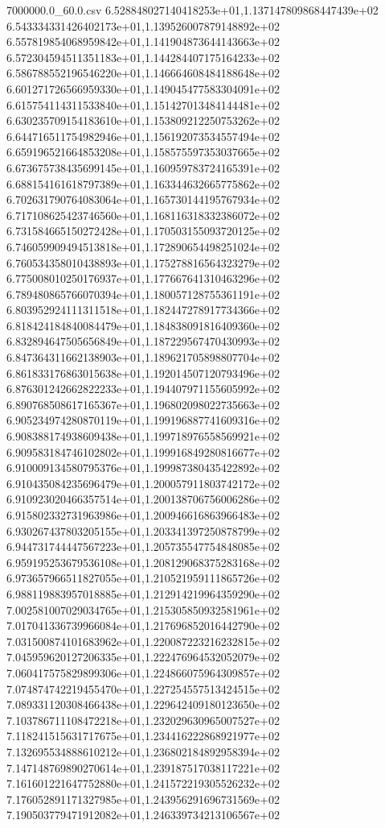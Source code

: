\begin{filecontents*}{7000000.0_60.0.csv}
6.528848027140418253e+01,1.137147809868447439e+02
6.543334331426402173e+01,1.139526007879148892e+02
6.557819854068959842e+01,1.141904873644143663e+02
6.572304594511351183e+01,1.144284407175164233e+02
6.586788552196546220e+01,1.146664608484188648e+02
6.601271726566959330e+01,1.149045477583304091e+02
6.615754114311533840e+01,1.151427013484144481e+02
6.630235709154183610e+01,1.153809212250753262e+02
6.644716511754982946e+01,1.156192073534557494e+02
6.659196521664853208e+01,1.158575597353037665e+02
6.673675738435699145e+01,1.160959783724165391e+02
6.688154161618797389e+01,1.163344632665775862e+02
6.702631790764083064e+01,1.165730144195767934e+02
6.717108625423746560e+01,1.168116318332386072e+02
6.731584665150272428e+01,1.170503155093720125e+02
6.746059909494513818e+01,1.172890654498251024e+02
6.760534358010438893e+01,1.175278816564323279e+02
6.775008010250176937e+01,1.177667641310463296e+02
6.789480865766070394e+01,1.180057128755361191e+02
6.803952924111311518e+01,1.182447278917734366e+02
6.818424184840084479e+01,1.184838091816409360e+02
6.832894647505656849e+01,1.187229567470430993e+02
6.847364311662138903e+01,1.189621705898807704e+02
6.861833176863015638e+01,1.192014507120793496e+02
6.876301242662822233e+01,1.194407971155605992e+02
6.890768508617165367e+01,1.196802098022735663e+02
6.905234974280870119e+01,1.199196887741609316e+02
6.908388174938609438e+01,1.199718976558569921e+02
6.909583184746102802e+01,1.199916849280816677e+02
6.910009134580795376e+01,1.199987380435422892e+02
6.910435084235696479e+01,1.200057911803742172e+02
6.910923020466357514e+01,1.200138706756006286e+02
6.915802332731963986e+01,1.200946616863966483e+02
6.930267437803205155e+01,1.203341397250878799e+02
6.944731744447567223e+01,1.205735547754848085e+02
6.959195253679536108e+01,1.208129068375283168e+02
6.973657966511827055e+01,1.210521959111865726e+02
6.988119883957018885e+01,1.212914219964359290e+02
7.002581007029034765e+01,1.215305850932581961e+02
7.017041336739966084e+01,1.217696852016442790e+02
7.031500874101683962e+01,1.220087223216232815e+02
7.045959620127206335e+01,1.222476964532052079e+02
7.060417575829899306e+01,1.224866075964309857e+02
7.074874742219455470e+01,1.227254557513424515e+02
7.089331120308466438e+01,1.229642409180123650e+02
7.103786711108472218e+01,1.232029630965007527e+02
7.118241515631717675e+01,1.234416222868921977e+02
7.132695534888610212e+01,1.236802184892958394e+02
7.147148769890270614e+01,1.239187517038117221e+02
7.161601221647752880e+01,1.241572219305526232e+02
7.176052891171327985e+01,1.243956291696731569e+02
7.190503779471912082e+01,1.246339734213106567e+02

\end{filecontents*}
